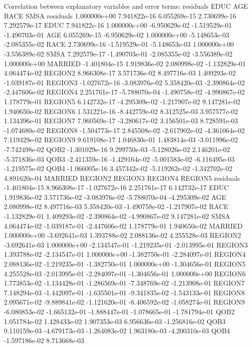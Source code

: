 \documentclass[
]{article}
\begin{document}
Correlation between explanatory variables and error terms: residuals
EDUC AGE RACE SMSA residuals 1.000000e+00 7.941822e-16 6.055269e-15
2.730699e-16 7.292579e-17 EDUC 7.941822e-16 1.000000e+00 -6.950629e-02
-1.519529e-01 -1.490703e-01 AGE 6.055269e-15 -6.950629e-02 1.000000e+00
-5.148653e-03 -2.085355e-02 RACE 2.730699e-16 -1.519529e-01
-5.148653e-03 1.000000e+00 -3.556389e-02 SMSA 7.292579e-17 -1.490703e-01
-2.085355e-02 -3.556389e-02 1.000000e+00 MARRIED -1.401804e-15
1.919836e-02 2.080998e-02 -1.132829e-01 4.064474e-02 REGION2
8.966308e-17 3.571736e-02 8.497716e-03 1.409293e-02 -1.039187e-01
REGION3 -1.027672e-16 -3.083976e-02 5.358420e-03 -2.390864e-02
-2.447606e-02 REGION4 2.251761e-17 -5.788070e-04 -1.490758e-02
-4.990867e-02 1.178779e-01 REGION5 6.142732e-17 -4.295309e-02
-1.217907e-02 9.147281e-02 1.940650e-02 REGION6 1.531221e-16
-8.442759e-02 8.312525e-03 3.957577e-02 1.134396e-01 REGION7
7.960569e-17 -3.280617e-02 3.156501e-03 8.728591e-03 -1.074680e-02
REGION8 -1.504773e-17 2.845508e-02 -2.617902e-02 -4.361064e-02
7.119329e-02 REGION9 9.619108e-17 1.046830e-01 1.483814e-03
-3.011996e-02 -7.742498e-02 QOB2 -1.301029e-16 9.299750e-03
-5.128026e-02 2.146201e-02 -5.371836e-03 QOB3 -2.411359e-16
-1.429164e-02 -5.001583e-02 -6.116495e-03 -1.219575e-02 QOB4
-1.066005e-16 3.457342e-02 -5.119262e-02 -1.342702e-02 4.891620e-04
MARRIED REGION2 REGION3 REGION4 REGION5 residuals -1.401804e-15
8.966308e-17 -1.027672e-16 2.251761e-17 6.142732e-17 EDUC 1.919836e-02
3.571736e-02 -3.083976e-02 -5.788070e-04 -4.295309e-02 AGE 2.080998e-02
8.497716e-03 5.358420e-03 -1.490758e-02 -1.217907e-02 RACE -1.132829e-01
1.409293e-02 -2.390864e-02 -4.990867e-02 9.147281e-02 SMSA 4.064474e-02
-1.039187e-01 -2.447606e-02 1.178779e-01 1.940650e-02 MARRIED
1.000000e+00 -3.692641e-03 1.393788e-02 2.088136e-02 4.255528e-03
REGION2 -3.692641e-03 1.000000e+00 -2.134547e-01 -1.219235e-01
-2.013995e-01 REGION3 1.393788e-02 -2.134547e-01 1.000000e+00
-1.382750e-01 -2.284097e-01 REGION4 2.088136e-02 -1.219235e-01
-1.382750e-01 1.000000e+00 -1.304656e-01 REGION5 4.255528e-03
-2.013995e-01 -2.284097e-01 -1.304656e-01 1.000000e+00 REGION6
1.773853e-02 -1.134428e-01 -1.286569e-01 -7.348769e-02 -1.213908e-01
REGION7 7.148294e-03 -1.442097e-01 -1.635501e-01 -9.341835e-02
-1.543133e-01 REGION8 2.095671e-02 -9.889841e-02 -1.121620e-01
-6.406592e-02 -1.058274e-01 REGION9 -6.080853e-02 -1.665132e-01
-1.888447e-01 -1.078665e-01 -1.781794e-01 QOB2 1.051784e-02 1.428433e-02
1.907353e-03 6.956636e-03 -1.256816e-02 QOB3 9.110159e-03 -4.679173e-03
-1.264083e-02 1.963180e-03 -4.200310e-03 QOB4 -1.597186e-02 8.713668e-03
\end{document}
